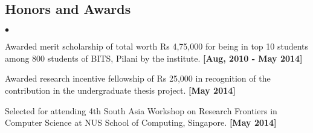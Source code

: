 \documentclass[margin,line]{res}
\newenvironment{list2}{
  \begin{list}{$\bullet$}{%
      \setlength{\itemsep}{0in}
      \setlength{\parsep}{0in} \setlength{\parskip}{0in}
      \setlength{\topsep}{0in} \setlength{\partopsep}{0in} 
      \setlength{\leftmargin}{0.2in}}}{\end{list}}
\begin{document}
\begin{resume}
\section{\sc Honors and Awards}
\begin{list2}
\item Awarded merit scholarship of total worth Rs 4,75,000 for being in top 10 students among 800 students of BITS, Pilani by the institute. {\bf [Aug, 2010 - May 2014]}

\item Awarded research incentive fellowship of Rs 25,000 in recognition of the contribution in the
undergraduate thesis project. {\bf [May 2014]}

\item Selected for attending 4th South Asia Workshop on Research Frontiers in Computer Science at
NUS School of Computing, Singapore. {\bf [May 2014]}
\end{list2}

\end{resume}
\end{document}
